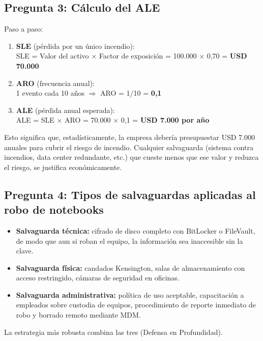 \documentclass[11pt,a4paper]{article}
\begin{document}
\subsection*{Pregunta 3: Cálculo del ALE}
\begin{respuesta}
Paso a paso:
\begin{enumerate}[leftmargin=*]
  \item \textbf{SLE} (pérdida por un único incendio):\\
  SLE = Valor del activo $\times$ Factor de exposición = 100.000 $\times$ 0,70 = \textbf{USD 70.000}
  \item \textbf{ARO} (frecuencia anual):\\
  1 evento cada 10 años $\Rightarrow$ ARO = 1/10 = \textbf{0,1}
  \item \textbf{ALE} (pérdida anual esperada):\\
  ALE = SLE $\times$ ARO = 70.000 $\times$ 0,1 = \textbf{USD 7.000 por año}
\end{enumerate}

Esto significa que, estadísticamente, la empresa debería presupuestar USD 7.000 anuales para cubrir el riesgo de incendio. Cualquier salvaguarda (sistema contra incendios, data center redundante, etc.) que cueste menos que ese valor y reduzca el riesgo, se justifica económicamente.
\end{respuesta}

\subsection*{Pregunta 4: Tipos de salvaguardas aplicadas al robo de notebooks}
\begin{respuesta}
\begin{itemize}[leftmargin=*]
  \item \textbf{Salvaguarda técnica:} cifrado de disco completo con BitLocker o FileVault, de modo que aun si roban el equipo, la información sea inaccesible sin la clave.
  \item \textbf{Salvaguarda física:} candados Kensington, salas de almacenamiento con acceso restringido, cámaras de seguridad en oficinas.
  \item \textbf{Salvaguarda administrativa:} política de uso aceptable, capacitación a empleados sobre custodia de equipos, procedimiento de reporte inmediato de robo y borrado remoto mediante MDM.
\end{itemize}
La estrategia más robusta combina las tres (Defensa en Profundidad).
\end{respuesta}
\end{document}
